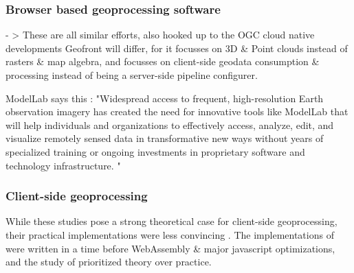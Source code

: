 \subsubsection*{Browser based geoprocessing software}

- >
These are all similar efforts, also hooked up to the OGC cloud native developments
Geofront will differ, for it focusses on 3D \& Point clouds instead of rasters \& map algebra, and focusses on client-side geodata consumption \& processing instead of being a server-side pipeline configurer.

ModelLab says this : "Widespread access to frequent, high-resolution Earth observation imagery has created the need for innovative tools like ModelLab that will help individuals and organizations to effectively access, analyze, edit, and visualize remotely sensed data in transformative new ways without years of specialized training or ongoing investments in proprietary software and technology infrastructure. "



\subsubsection*{Client-side geoprocessing}


While these studies pose a strong theoretical case for client-side geoprocessing, their practical implementations were less convincing . 
The implementations of \cite{panidi_hybrid_2015, hamilton_client-side_2014} were written in a time before WebAssembly \& major javascript optimizations, and the study of \cite{kulawiak_analysis_2019} prioritized theory over practice. 


